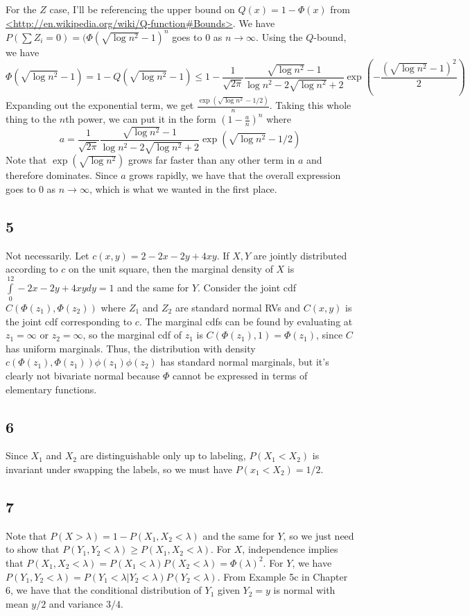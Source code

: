 \documentclass{article}
\begin{document}
For the $Z$ case, I'll be referencing the upper bound on $Q(x)=1-\Phi(x)$ from \url{<http://en.wikipedia.org/wiki/Q-function#Bounds>}. We have $P(\sum Z_i=0)=(\Phi(\sqrt{\log n^2}-1)^n$ goes to $0$ as $n\to\infty$. Using the $Q$-bound, we have 
$$\Phi(\sqrt{\log n^2}-1)=1-Q(\sqrt{\log n^2}-1)\leq1-\frac{1}{\sqrt{2\pi}}\frac{\sqrt{\log n^2}-1}{\log n^2-2\sqrt{\log n^2}+2}\exp\left(-\frac{(\sqrt{\log n^2}-1)^2}{2}\right)$$
Expanding out the exponential term, we get $\frac{\exp(\sqrt{\log n^2}-1/2)}{n}$. Taking this whole thing to the $n$th power, we can put it in the form $\left(1-\frac{a}{n}\right)^n$ where 
$$a=\frac{1}{\sqrt{2\pi}}\frac{\sqrt{\log n^2}-1}{\log n^2-2\sqrt{\log n^2}+2}\exp(\sqrt{\log n^2}-1/2)$$
Note that $\exp(\sqrt{\log n^2})$ grows far faster than any other term in $a$ and therefore dominates. Since $a$ grows rapidly, we have that the overall expression goes to $0$ as $n\to\infty$, which is what we wanted in the first place.
\subsection*{5}
Not necessarily. Let $c(x,y)=2-2x-2y+4xy$. If $X,Y$ are jointly distributed according to $c$ on the unit square, then the marginal density of $X$ is $\int\limits_0^12-2x-2y+4xy dy=1$ and the same for $Y$. Consider the joint cdf $C(\Phi(z_1),\Phi(z_2))$ where $Z_1$ and $Z_2$ are standard normal RVs and $C(x,y)$ is the joint cdf corresponding to $c$. The marginal cdfs can be found by evaluating at $z_1=\infty$ or $z_2=\infty$, so the marginal cdf of $z_1$ is $C(\Phi(z_1),1)=\Phi(z_1)$, since $C$ has uniform marginals. Thus, the distribution with density $c(\Phi(z_1),\Phi(z_1))\phi(z_1)\phi(z_2)$ has standard normal marginals, but it's clearly not bivariate normal because $\Phi$ cannot be expressed in terms of elementary functions.
\subsection*{6}
Since $X_1$ and $X_2$ are distinguishable only up to labeling, $P(X_1<X_2)$ is invariant under swapping the labels, so we must have $P(x_1<X_2)=1/2$.
\subsection*{7}
Note that $P(X>\lambda)=1-P(X_1,X_2<\lambda)$ and the same for $Y$, so we just need to show that $P(Y_1,Y_2<\lambda)\geq P(X_1,X_2<\lambda)$. For $X$, independence implies that $P(X_1,X_2<\lambda)=P(X_1<\lambda)P(X_2<\lambda)=\Phi(\lambda)^2$. For $Y$, we have $P(Y_1,Y_2<\lambda)=P(Y_1<\lambda|Y_2<\lambda)P(Y_2<\lambda)$. From Example 5c in Chapter 6, we have that the conditional distribution of $Y_1$ given $Y_2=y$ is normal with mean $y/2$ and variance $3/4$. 
\end{document}
